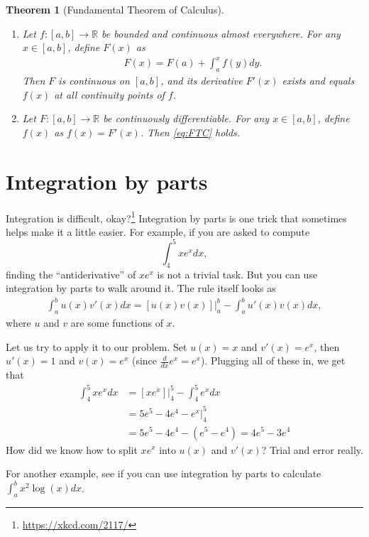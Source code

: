 \documentclass{article}
\newtheorem{theorem}{Theorem}
\begin{document}
\begin{theorem}[Fundamental Theorem of Calculus]
	\,
	\begin{enumerate}
		\item Let $f:[a,b] \to \mathbb{R}$ be bounded and continuous almost everywhere. For any $x \in [a,b]$, define $F(x)$ as
		\begin{align} \label{eq:FTC}
			F(x) = F(a) + \int_a^x f(y) dy.
		\end{align}
		Then $F$ is continuous on $[a,b]$, and its derivative $F'(x)$ exists and equals $f(x)$ at all continuity points of $f$.
		
		\item Let $F:[a,b] \to \mathbb{R}$ be continuously differentiable. For any $x \in [a,b]$, define $f(x)$ as $f(x)=F'(x)$. Then \eqref{eq:FTC} holds.
	\end{enumerate}
\end{theorem}




\section{Integration by parts}

Integration is difficult, okay?\footnote{\url{https://xkcd.com/2117/}} Integration by parts is one trick that sometimes helps make it a little easier. For example, if you are asked to compute 
$$\int_4^5 xe^x dx,$$ finding the ``antiderivative'' of $xe^x$ is not a trivial task. But you can use integration by parts to walk around it. The rule itself looks as
\begin{align} \label{eq:IBP}
	\int_a^b u(x) v'(x) dx = [u(x)v(x)]|_a^b - \int_a^b u'(x) v(x) dx,
\end{align}
where $u$ and $v$ are some functions of $x$. 

Let us try to apply it to our problem. Set $u(x)=x$ and $v'(x)=e^x$, then $u'(x)=1$ and $v(x)=e^x$ (since $\frac{d}{dx}e^x = e^x$). Plugging all of these in, we get that
\begin{align*}
	\int_4^5 xe^x dx &= \left.\left[xe^x\right]\right|_4^5 - \int_4^5 e^x dx
	\\
	&=5e^5 - 4e^4 - \left. e^x \right|_4^5
	\\
	&=5e^5 - 4e^4 - \left(e^5 - e^4\right) = 4e^5 - 3e^4
\end{align*}
How did we know how to split $xe^x$ into $u(x)$ and $v'(x)$? Trial and error really.

For another example, see if you can use integration by parts to calculate $\int_a^b x^2 \log (x) dx$.
\end{document}
